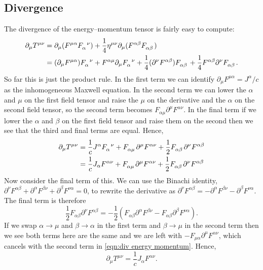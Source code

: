 \subsection{Divergence}
The divergence of the energy--momentum tensor is fairly easy to compute:
\begin{align}
    \partial_\mu T^{\mu\nu} &= \partial_\mu(\tensor{F}{^{\mu\alpha}} \tensor{F}{_\alpha^\nu}) + \frac{1}{4}\eta^{\mu\nu} \partial_\mu (\tensor{F}{^{\alpha\beta}}\tensor{F}{_{\alpha\beta}})\\
    &= (\partial_\mu\tensor{F}{^{\mu\alpha}})\tensor{F}{_\alpha^\nu} + \tensor{F}{^{\alpha\mu}} \partial_\mu \tensor{F}{_\alpha^\nu} + \frac{1}{4} (\partial^\nu \tensor{F}{^{\alpha\beta}}) \tensor{F}{_{\alpha\beta}} + \frac{1}{4} \tensor{F}{^{\alpha\beta}} \partial^\nu \tensor{F}{_{\alpha\beta}}.
\end{align}
So far this is just the product rule.
In the first term we can identify \(\partial_\mu F^{\mu\alpha} = J^\alpha/c\) as the inhomogeneous Maxwell equation.
In the second term we can lower the \(\alpha\) and \(\mu\) on the first field tensor and raise the \(\mu\) on the derivative and the \(\alpha\)  on the second field tensor, so the second term becomes \(F_{\alpha\mu}\partial^\mu F^{\alpha\nu}\).
In the final term if we lower the \(\alpha\) and \(\beta\) on the first field tensor and raise them on the second then we see that the third and final terms are equal.
Hence,
\begin{align}
    \partial_\mu T^{\mu\nu} &= \frac{1}{c}J^\alpha\tensor{F}{_\alpha^\nu} + \tensor{F}{_{\alpha\mu}}\partial^\mu\tensor{F}{^{\alpha\nu}} + \frac{1}{2}\tensor{F}{_{\alpha\beta}}\partial^\nu \tensor{F}{^{\alpha\beta}}\\
    &= \frac{1}{c}J_\alpha\tensor{F}{^{\alpha\nu}} + \tensor{F}{_{\alpha\mu}}\partial^\mu\tensor{F}{^{\alpha\nu}} + \frac{1}{2}\tensor{F}{_{\alpha\beta}}\partial^\nu \tensor{F}{^{\alpha\beta}}\label{eqn:div energy momentum}
\end{align}
Now consider the final term of this.
We can use the Binachi identity, \(\partial^\nu F^{\alpha\beta} + \partial^\alpha F^{\beta\nu} + \partial^\beta F^{\nu\alpha} = 0\), to rewrite the derivative as \(\partial^\nu F^{\alpha\beta} = -\partial^\alpha F^{\beta\nu} - \partial^\beta F^{\nu\alpha}\).
The final term is therefore
\begin{equation}
    \frac{1}{2}F_{\alpha\beta} \partial^\nu F^{\alpha\beta} = -\frac{1}{2}(F_{\alpha\beta}\partial^\alpha F^{\beta\nu} - F_{\alpha\beta} \partial^\beta F^{\nu\alpha}).
\end{equation}
If we swap \(\alpha \to \mu\) and \(\beta \to \alpha\) in the first term and \(\beta \to \mu\) in the second term then we see both terms here are the same and we are left with \(-F_{\mu\alpha}\partial^\mu F^{\alpha\nu}\), which cancels with the second term in \cref{eqn:div energy momentum}.
Hence,
\begin{equation}
    \partial_\mu T^{\mu\nu} = \frac{1}{c}J_\alpha F^{\alpha\nu}.
\end{equation}

